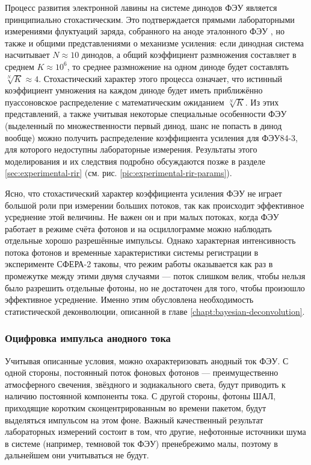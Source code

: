 Процесс развития электронной лавины на системе динодов ФЭУ является принципиально стохастическим. Это подтверждается прямыми лабораторными измерениями флуктуаций заряда, собранного на аноде эталонного ФЭУ \cite[рис. 9]{SphereCalibration2016}, но также и общими представлениями о механизме усиления: если динодная система насчитывает $N \approx 10$ динодов, а общий коэффициент размножения составляет в среднем $K \approx 10^6$, то среднее размножение на одном диноде будет составлять $\sqrt[N]{K} \approx 4$. Стохастический характер этого процесса означает, что истинный коэффициент умножения на каждом диноде будет иметь приближённо пуассоновское распределение с математическим ожиданием $\sqrt[N]{K}$. Из этих представлений, а также учитывая некоторые специальные особенности ФЭУ (выделенный по множественности первый динод, шанс не попасть в динод вообще) можно получить распределение коэффициента усиления для ФЭУ84-3, для которого недоступны лабораторные измерения. Результаты этого моделирования и их следствия подробно обсуждаются позже в разделе \ref{sec:experimental-rir} (см. рис. \ref{pic:experimental-rir-params}).

Ясно, что стохастический характер коэффициента усиления ФЭУ не играет большой роли при измерении больших потоков, так как происходит эффективное усреднение этой величины. Не важен он и при малых потоках, когда ФЭУ работает в режиме счёта фотонов и на осциллограмме можно наблюдать отдельные хорошо разрешённые импульсы. Однако характерная интенсивность потока фотонов и временные характеристики системы регистрации в эксперименте СФЕРА-2 таковы, что режим работы оказывается как раз в промежутке между этими двумя случаями --- поток слишком велик, чтобы нельзя было разрешить отдельные фотоны, но не достаточен для того, чтобы произошло эффективное усреднение. Именно этим обусловлена необходимость статистической деконволюции, описанной в главе \ref{chapt:bayesian-deconvolution}.

\subsubsection{Оцифровка импульса анодного тока}

Учитывая описанные условия, можно охарактеризовать анодный ток ФЭУ. С одной стороны, постоянный поток фоновых фотонов --- преимущественно атмосферного свечения, звёздного и зодиакального света, будут приводить к наличию постоянной компоненты тока. С другой стороны, фотоны ШАЛ, приходящие коротким сконцентрированным во времени пакетом, будут выделяться импульсом на этом фоне. Важный качественный результат лабораторных измерений состоит в том, что другие, нефотонные источники шума в системе (например, темновой ток ФЭУ) пренебрежимо малы, поэтому в дальнейшем они учитываться не будут.

